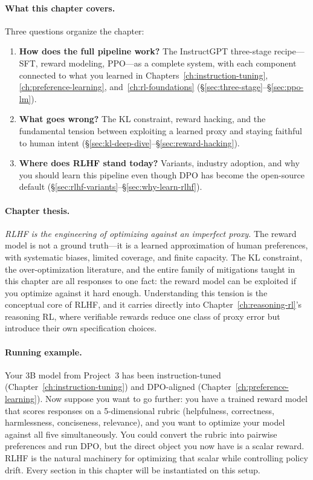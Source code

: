 \paragraph{What this chapter covers.} Three questions organize the chapter:

\begin{enumerate}[nosep]
  \item \textbf{How does the full pipeline work?} The InstructGPT three-stage recipe---SFT, reward modeling, PPO---as a complete system, with each component connected to what you learned in Chapters~\ref{ch:instruction-tuning}, \ref{ch:preference-learning}, and~\ref{ch:rl-foundations} (\S\ref{sec:three-stage}--\S\ref{sec:ppo-lm}).
  \item \textbf{What goes wrong?} The KL constraint, reward hacking, and the fundamental tension between exploiting a learned proxy and staying faithful to human intent (\S\ref{sec:kl-deep-dive}--\S\ref{sec:reward-hacking}).
  \item \textbf{Where does RLHF stand today?} Variants, industry adoption, and why you should learn this pipeline even though DPO has become the open-source default (\S\ref{sec:rlhf-variants}--\S\ref{sec:why-learn-rlhf}).
\end{enumerate}

\paragraph{Chapter thesis.} \emph{RLHF is the engineering of optimizing against an imperfect proxy.} The reward model is not a ground truth---it is a learned approximation of human preferences, with systematic biases, limited coverage, and finite capacity. The KL constraint, the over-optimization literature, and the entire family of mitigations taught in this chapter are all responses to one fact: the reward model can be exploited if you optimize against it hard enough. Understanding this tension is the conceptual core of RLHF, and it carries directly into Chapter~\ref{ch:reasoning-rl}'s reasoning RL, where verifiable rewards reduce one class of proxy error but introduce their own specification choices.

\paragraph{Running example.} Your 3B model from Project~3 has been instruction-tuned (Chapter~\ref{ch:instruction-tuning}) and DPO-aligned (Chapter~\ref{ch:preference-learning}). Now suppose you want to go further: you have a trained reward model that scores responses on a 5-dimensional rubric (helpfulness, correctness, harmlessness, conciseness, relevance), and you want to optimize your model against all five simultaneously. You could convert the rubric into pairwise preferences and run DPO, but the direct object you now have is a scalar reward. RLHF is the natural machinery for optimizing that scalar while controlling policy drift. Every section in this chapter will be instantiated on this setup.

